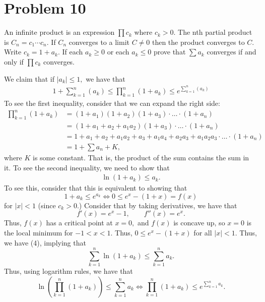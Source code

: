\documentclass[11pt]{article}
\begin{document}
\section*{Problem 10}
\begin{problem}
    An infinite product is an expression $\prod c_k$ where $c_k>0$. The nth partial
 product is $C_n = c_1\cdots c_n.$ If $C_n$ converges to a limit $C\neq 0$ then the product
 converges to $C$. Write $c_k =1+a_k$. If each $a_k \geq 0$ or each $a_k \leq 0$ prove that $\sum a_k$ converges if and only if $\prod c_k$ converges.
\end{problem}
\begin{solution}
We claim that if $|a_k|\leq 1,$ we have that
        \begin{align}
            1 + \sum_{k=1}^n(a_k) \leq \prod_{k=1}^{n}(1 + a_k)\leq e^{\sum_{k=1}^n(a_k)}
        \end{align}
        To see the first inequality, consider that we can expand the right side:
        \begin{align*}
        \prod_{k=1}^n (1 +a_k) &= (1 + a_1)(1+a_2)(1 + a_3) \cdot \dots \cdot (1 + a_n)\\
        &= (1 + a_1 + a_2+a_1a_2)(1 + a_3) \cdot \dots  \cdot (1 + a_n)\\
        &= 1 + a_1 + a_2 + a_1a_2 + a_3 + a_1a_4 + a_2a_3 +a_1a_2a_3\cdot \dots \cdot (1+a_n)\\
        &= 1 + \sum a_n + K,
        \end{align*}
        where $K$ is some constant. That is, the product of the sum contains the sum in it. To see the second inequality, we need to show that 
        \begin{align}
                    \ln(1 + a_k)\leq a_k.
        \end{align}
        To see this, consider that this is equivalent to showing that 
        \[1 + a_k \leq e^{a_k} \iff 0 \leq e^x - (1 + x) = f(x)\] for $|x|< 1$ (since $c_k > 0.$) Consider that by taking derivatives, we have that
        \[f'(x) = e^x - 1, \qquad f''(x) = e^x.\] Thus, $f(x)$ has a critical point at $x=0,$ and $f(x)$ is concave up, so $x=0$ is the local minimum for $-1<x<1.$ Thus, $0\leq e^x - (1 + x)$ for all $|x|<1.$ Thus, we have (4), implying that 
        \[\sum_{k=1}^n\ln(1 + a_k)\leq \sum_{k=1}^na_k.\] Thus, using logarithm rules, we have that 
        \[\ln\left(\prod_{k=1}^n (1 + a_k)\right)\leq \sum_{k=1}^na_k\iff \prod_{k=1}^n(1 + a_k) \leq e^{\sum_{k=1}^na_k}.\]
    \begin{itemize}

\end{itemize}
\end{solution}
\end{document}
